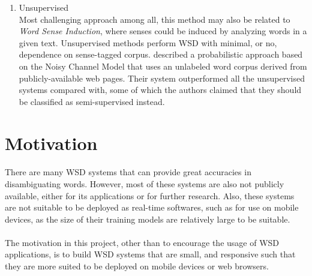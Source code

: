 \begin{enumerate}
\item Unsupervised \\
Most challenging approach among all, this method may also be related to \textit{Word Sense Induction}, where senses could be induced by analyzing words in a given text. Unsupervised methods perform WSD with minimal, or no, dependence on sense-tagged corpus. \cite{noisy} described a probabilistic approach based on the Noisy Channel Model that uses an unlabeled word corpus derived from publicly-available web pages. Their system outperformed all the unsupervised systems compared with, some of which the authors claimed that they should be classified as semi-supervised instead.
\end{enumerate}

\section{Motivation}
\paragraph{}
There are many WSD systems that can provide great accuracies in disambiguating words. However, most of these systems are also not publicly available, either for its applications or for further research. Also, these systems are not suitable to be deployed as real-time softwares, such as for use on mobile devices, as the size of their training models are relatively large to be suitable.

\paragraph{}
The motivation in this project, other than to encourage the usage of WSD applications, is to build WSD systems that are small, and responsive such that they are more suited to be deployed on mobile devices or web browsers.


